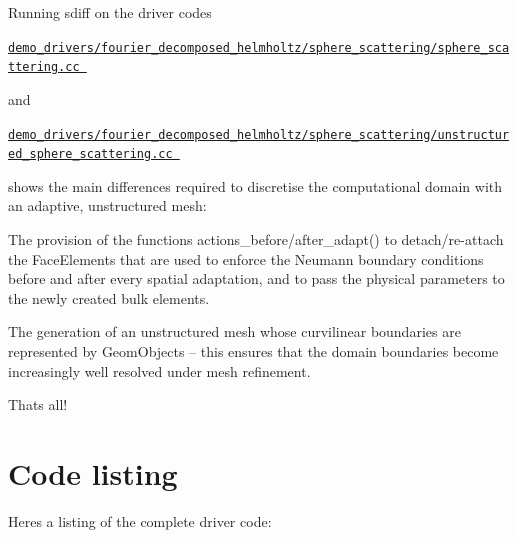 Running {\ttfamily sdiff} on the driver codes \begin{center} \href{../../../../demo_drivers/fourier_decomposed_helmholtz/sphere_scattering/sphere_scattering.cc}{\tt demo\+\_\+drivers/fourier\+\_\+decomposed\+\_\+helmholtz/sphere\+\_\+scattering/sphere\+\_\+scattering.\+cc } \end{center}  and \begin{center} \href{../../../../demo_drivers/fourier_decomposed_helmholtz/sphere_scattering/unstructured_sphere_scattering.cc}{\tt demo\+\_\+drivers/fourier\+\_\+decomposed\+\_\+helmholtz/sphere\+\_\+scattering/unstructured\+\_\+sphere\+\_\+scattering.\+cc } \end{center}  shows the main differences required to discretise the computational domain with an adaptive, unstructured mesh\+:
\begin{DoxyItemize}
\item The provision of the functions {\ttfamily actions\+\_\+before/after\+\_\+adapt}() to detach/re-\/attach the {\ttfamily Face\+Elements} that are used to enforce the Neumann boundary conditions before and after every spatial adaptation, and to pass the physical parameters to the newly created bulk elements. ~\newline
~\newline

\item The generation of an unstructured mesh whose curvilinear boundaries are represented by {\ttfamily Geom\+Objects} -- this ensures that the domain boundaries become increasingly well resolved under mesh refinement.
\end{DoxyItemize}That\textquotesingle{}s all!



 

\hypertarget{index_code}{}\section{Code listing}\label{index_code}
Here\textquotesingle{}s a listing of the complete driver code\+:


